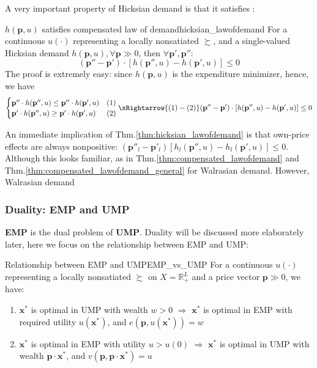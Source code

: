 A very important property of Hicksian demand is that it satisfies :
\begin{theorem}{$h(\mathbf{p},u)$ satisfies compensated law of demand}{hicksian_lawofdemand}
    For a continuous $u(\cdot)$ representing a locally nonsatiated $\succsim$, and a single-valued Hicksian demand $h(\mathbf{p},u),\forall \mathbf{p}\gg 0$, then $\forall \mathbf{p}',\mathbf{p}''$:
    $$(\mathbf{p}''-\mathbf{p}')\cdot [h(\mathbf{p}'',u)-h(\mathbf{p}',u)]\leq 0$$
    The proof is extremely easy: since $h(\mathbf{p},u)$ is the expenditure minimizer, hence, we have
    $$
    \begin{cases}
        \mathbf{p}''\cdot h(\mathbf{p}'',u) \leq \mathbf{p}''\cdot h(\mathbf{p}',u) &(1)\\
        \mathbf{p}'\cdot h(\mathbf{p}'',u) \geq \mathbf{p}'\cdot h(\mathbf{p}',u)&(2)
    \end{cases}\xRightarrow{(1)-(2)}(\mathbf{p}''-\mathbf{p}')\cdot [h(\mathbf{p}'',u)-h(\mathbf{p}',u)]\leq 0
    $$
\end{theorem}
An immediate implication of Thm.\ref{thm:hicksian_lawofdemand} is that own-price effects are always nonpositive: $(\mathbf{p}''_l-\mathbf{p}'_l)[h_l(\mathbf{p}'',u)-h_l(\mathbf{p}',u)]\leq 0$.
Although this looks familiar, as in Thm.\ref{thm:compensated_lawofdemand} and Thm.\ref{thm:compensated_lawofdemand_general} for Walrasian demand. However, Walrasian demand 

\subsubsection*{Duality: EMP and UMP}

\textbf{EMP} is the dual problem of \textbf{UMP}. Duality will be discussed more elaborately later, here we focus on the relationship between EMP and UMP:
\begin{theorem}{Relationship between EMP and UMP}{EMP_vs_UMP}
    For a continuous $u(\cdot)$ representing a locally nonsatiated $\succsim$ on $X=\mathbb{R}^L_+$ and a price vector $\mathbf{p}\gg 0$, we have:
    \begin{enumerate}
        \item $\mathbf{x}^*$ is optimal in UMP with wealth $w>0$ $\Rightarrow$ $\mathbf{x}^*$ is optimal in EMP with required utility $u(\mathbf{x}^*)$, and $e(\mathbf{p},u(\mathbf{x}^*))=w$
        \item $\mathbf{x}^*$ is optimal in EMP with utility $u>u(0)$ $\Rightarrow$ $\mathbf{x}^*$ is optimal in UMP with wealth $\mathbf{p}\cdot\mathbf{x}^*$, and $v(\mathbf{p},\mathbf{p}\cdot\mathbf{x}^*)=u$
    \end{enumerate}
\end{theorem}

